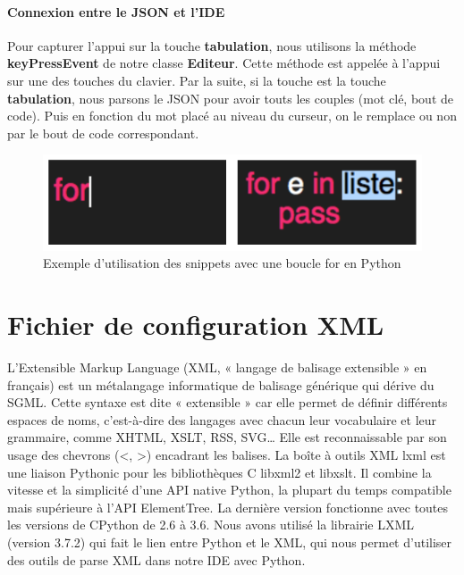 \documentclass[a4paper,12pt]{article}
\begin{document}
		\paragraph{Connexion entre le JSON et l'IDE}

			Pour capturer l'appui sur la touche \textbf{tabulation}, nous utilisons la méthode \textbf{keyPressEvent} de notre classe \textbf{Editeur}. Cette méthode est appelée à l'appui sur une des touches du clavier. Par la suite, si la touche est la touche \textbf{tabulation}, nous parsons le JSON pour avoir touts les couples (mot clé, bout de code). Puis en fonction du mot placé au niveau du curseur, on le remplace ou non par le bout de code correspondant.

			\begin{figure}[h!]
				\begin{center}
					\includegraphics[scale=0.7]{images/exampleFor}
					\caption{Exemple d'utilisation des snippets avec une boucle for en Python}
				\end{center}
			\end{figure}

\section{Fichier de configuration XML}

L'Extensible Markup Language (XML, « langage de balisage extensible » en français) est un métalangage informatique de balisage générique qui dérive du SGML. Cette syntaxe est dite « extensible » car elle permet de définir différents espaces de noms, c'est-à-dire des langages avec chacun leur vocabulaire et leur grammaire, comme XHTML, XSLT, RSS, SVG… Elle est reconnaissable par son usage des chevrons (<, >) encadrant les balises. 
La boîte à outils XML lxml est une liaison Pythonic pour les bibliothèques C libxml2 et libxslt. Il combine la vitesse et la simplicité d'une API native Python, la plupart du temps compatible mais supérieure à l'API ElementTree. La dernière version fonctionne avec toutes les versions de CPython de 2.6 à 3.6. Nous avons utilisé la librairie LXML (version 3.7.2) qui fait le lien entre Python et le XML, qui nous permet d'utiliser des outils de parse XML dans notre IDE avec Python. 
\end{document}
